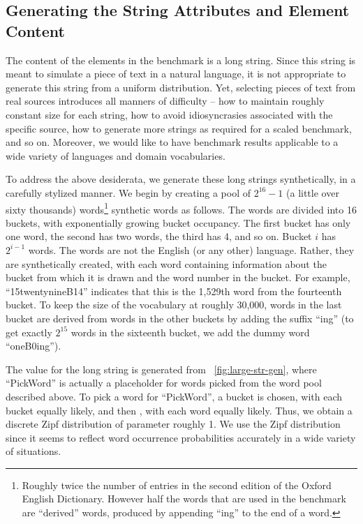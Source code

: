 \subsection{Generating the String Attributes and Element Content}
\label{sec:strings}
The content of the elements in the benchmark is a long string.  Since
this  \new{} string is meant to simulate a piece of text in a natural
language, it is not appropriate to generate this string from a uniform
distribution.  Yet, selecting pieces of text from real sources
introduces all manners of difficulty -- how to maintain roughly
constant size for each string, how to avoid idiosyncrasies associated
with the specific source, how to generate more strings as required for
a scaled benchmark, and so on.  Moreover, we would like to have
benchmark results applicable to a wide variety of languages and domain
vocabularies.

To address the above desiderata, we generate these long strings
synthetically, in a carefully stylized manner.  We begin by creating a
pool of $2^{16}-1$ (a little over sixty thousands)
words\footnote{Roughly twice the number of entries in the second
edition of the Oxford English Dictionary. However half the words that
are used in the benchmark are ``derived'' words, produced by appending
``ing'' to the end of a word.} synthetic words as follows. The words
are divided into 16 buckets, with exponentially growing bucket
occupancy.  The first bucket has only one word, the second has two
words, the third has 4, and so on.  Bucket $i$ has $2^{i-1}$ words.
The words are not   the English (or any other) language.
Rather, they are synthetically created, with each word containing
information about the bucket from which it is drawn and the word
number in the bucket.  For example, ``15twentynineB14'' indicates that
this is the 1,529th word from the fourteenth bucket.  To keep the size
of the vocabulary at roughly 30,000, words in the last bucket are
derived from words in the other buckets by adding the suffix ``ing''
(to get exactly $2^{15}$ words in the sixteenth bucket, we add the
dummy word ``oneB0ing'').

The value for the long string is generated from  ~\ref{fig:large-str-gen}, where ``PickWord'' is actually a placeholder for words
picked from the word pool described above.  To pick a word for
``PickWord'', a bucket is chosen, with each bucket equally likely, and
then  , with each word equally
likely. Thus, we obtain a discrete Zipf distribution of parameter
roughly 1.  We use the Zipf distribution since it seems to reflect
word occurrence probabilities accurately in a wide variety of
situations.

